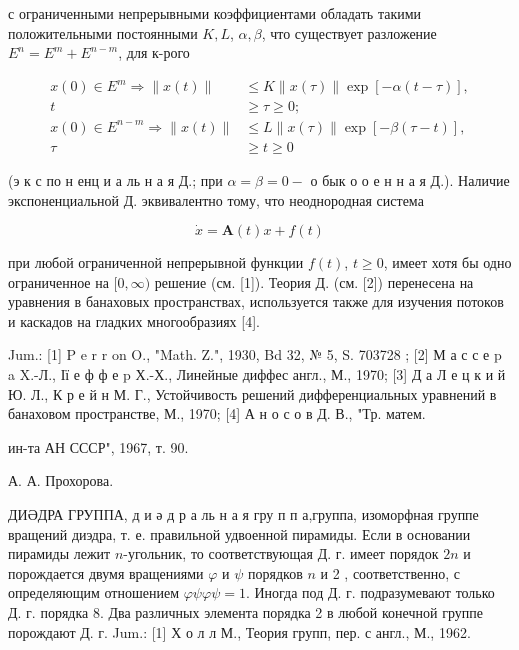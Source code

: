 \documentclass[10pt]{article}
\begin{document}
с ограниченными непрерывными коэффициентами обладать такими положительными постоянными $K, L$, $\alpha, \beta$, что существует разложение $E^{n}=E^{m}+E^{n-m}$, для к-рого



\[

\begin{aligned}

x(0) \in E^{m} \Rightarrow\|x(t)\| & \leqslant K\|x(\tau)\| \exp [-\alpha(t-\tau)], \\

t & \geqslant \tau \geqslant 0 ; \\

x(0) \in E^{n-m} \Rightarrow\|x(t)\| & \leqslant L\|x(\tau)\| \exp [-\beta(\tau-t)], \\

\tau & \geqslant t \geqslant 0

\end{aligned}

\]



(э к с по н енц и а ль н а я Д.; при $\alpha=\beta=0-$ о бык о о е н н а я Д.). Наличие экспоненциальной Д. эквивалентно тому, что неоднородная система



\[

\dot{x}=\boldsymbol{A}(t) x+f(t)

\]



при любой ограниченной непрерывной функции $f(t)$, $t \geqslant 0$, имеет хотя бы одно ограниченное на $[0, \infty)$ решение (см. [1]). Теория Д. (см. [2]) перенесена на уравнения в банаховых пространствах, используется также для изучения потоков и каскадов на гладких многообразиях [4].



Jum.: [1] P e r r on O., "Math. Z.", 1930, Bd 32, № 5, S. 703728 ; [2] М а с с е p a X.-Л., Ії е ф ф е p Х.-Х., Линейные диффес англ., М., 1970; [3] Д а Л е ц к и й Ю. Л., К р е й н М. Г., Устойчивость решений дифференциальных уравнений в банаховом пространстве, М., 1970; [4] А н о с о в Д. В., "Тр. матем.

ин-та АН СССР", 1967, т. 90.

А. А. Прохорова.



ДИӘДРА ГРУППА, д и ә д р а ль н а я гру п п а,группа, изоморфная группе вращений диэдра, т. е. правильной удвоенной пирамиды. Если в основании пирамиды лежит $n$-угольник, то соответствующая Д. г. имеет порядок $2 n$ и порождается двумя вращениями $\varphi$ и $\psi$ порядков $n$ и 2 , соответственно, с определяющим отношением $\varphi \psi \varphi \psi=1$. Иногда под Д. г. подразумевают только Д. г. порядка 8. Два различных элемента порядка 2 в любой конечной группе порождают Д. г. Jum.: [1] Х о л л М., Теория групп, пер. с англ., М., 1962.
\end{document}
